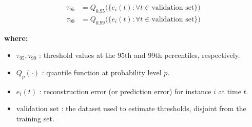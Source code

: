 \begin{align}
\tau_{95} &= Q_{0.95}\big(\{e_i(t) : \forall t \in \text{validation set}\}\big) \\
\tau_{99} &= Q_{0.99}\big(\{e_i(t) : \forall t \in \text{validation set}\}\big)
\label{fig:threshold}
\end{align}

\noindent\textbf{where:}
\begin{itemize}
    \item $\tau_{95}, \tau_{99}$ : threshold values at the 95th and 99th percentiles, respectively.
    \item $Q_{p}(\cdot)$ : quantile function at probability level $p$.
    \item $e_i(t)$ : reconstruction error (or prediction error) for instance $i$ at time $t$.
    \item $\text{validation set}$ : the dataset used to estimate thresholds, disjoint from the training set.
\end{itemize}
